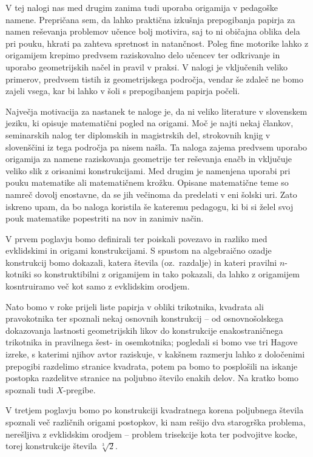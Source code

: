 V tej nalogi nas med drugim zanima tudi uporaba origamija v pedagoške namene. Prepričana sem, da lahko praktična izkušnja prepogibanja papirja za namen reševanja problemov učence bolj motivira, saj to ni običajna oblika dela pri pouku, hkrati pa zahteva spretnost in natančnost. Poleg fine motorike lahko z origamijem krepimo predvsem raziskovalno delo učencev ter odkrivanje in uporabo geometrijskih načel in pravil v praksi. V nalogi je vključenih veliko primerov, predvsem tistih iz geometrijskega področja, vendar še zdaleč ne bomo zajeli vsega, kar bi lahko v šoli s prepogibanjem papirja počeli.

Največja motivacija za nastanek te naloge je, da ni veliko literature v slovenskem jeziku, ki opisuje matematični pogled na origami. Moč je najti nekaj člankov, seminarskih nalog ter diplomskih in magistrskih del, strokovnih knjig v slovenščini iz tega področja pa nisem našla. Ta naloga zajema predvsem uporabo origamija za namene raziskovanja geometrije ter reševanja enačb in vključuje veliko slik z orisanimi konstrukcijami. Med drugim je namenjena uporabi pri pouku matematike ali matematičnem krožku. Opisane matematične teme so namreč dovolj enostavne, da se jih večinoma da predelati v eni šolski uri. Zato iskreno upam, da bo naloga koristila še kateremu pedagogu, ki bi si želel svoj pouk matematike popestriti na nov in zanimiv način.

V prvem poglavju bomo definirali ter poiskali povezavo in razliko med evklidskimi in origami konstrukcijami. S spustom na algebraično ozadje konstrukcij bomo dokazali, katera števila (oz.\ razdalje) in kateri pravilni $n$-kotniki so konstruktibilni z origamijem in tako pokazali, da lahko z origamijem kosntruiramo več kot samo z evklidskim orodjem.

Nato bomo v roke prijeli liste papirja v obliki trikotnika, kvadrata ali pravokotnika ter spoznali nekaj osnovnih konstrukcij -- od osnovnošolskega dokazovanja lastnosti geometrijskih likov do konstrukcije enakostraničnega trikotnika in pravilnega šest- in osemkotnika; pogledali si bomo vse tri Hagove izreke, s katerimi njihov avtor raziskuje, v kakšnem razmerju lahko z določenimi prepogibi razdelimo stranice kvadrata, potem pa bomo to posplošili na iskanje postopka razdelitve stranice na poljubno število enakih delov. Na kratko bomo spoznali tudi $X$-pregibe.

V tretjem poglavju bomo po konstrukciji kvadratnega korena poljubnega števila spoznali več različnih origami postopkov, ki nam rešijo dva starogrška problema, nerešljiva z evklidskim orodjem -- problem trisekcije kota ter podvojitve kocke, torej konstrukcije števila $\sqrt[3]{2}$.

